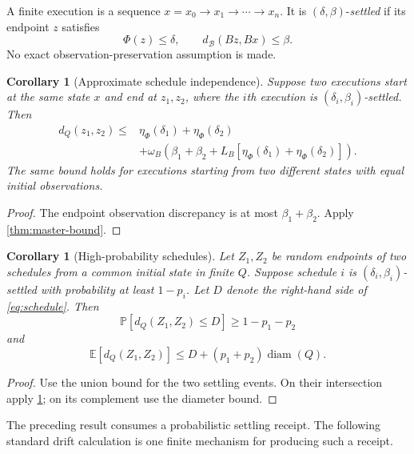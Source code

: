 \documentclass[11pt]{article}
\newtheorem{corollary}[theorem]{Corollary}
\theoremstyle{definition}
\theoremstyle{remark}
\numberwithin{equation}{section}
\newcommand{\diam}{\operatorname{diam}}
\newcommand{\cB}{\mathcal B}
\begin{document}
A finite execution is a sequence $x=x_0\to x_1\to\cdots\to x_n$.  It is $(\delta,\beta)$-\emph{settled} if its endpoint $z$ satisfies
\[
 \Phi(z)\le\delta,
 \qquad d_{\cB}(Bz,Bx)\le\beta.
\]
No exact observation-preservation assumption is made.

\begin{corollary}[Approximate schedule independence]\label{cor:schedule}
Suppose two executions start at the same state $x$ and end at $z_1,z_2$, where the $i$th execution is $(\delta_i,\beta_i)$-settled.  Then
\begin{equation}\label{eq:schedule}
\begin{split}
 d_Q(z_1,z_2)\le{}&\eta_\Phi(\delta_1)+\eta_\Phi(\delta_2)\\
 &+\omega_B\!\left(
 \beta_1+\beta_2+L_B[\eta_\Phi(\delta_1)+\eta_\Phi(\delta_2)]
 \right).
\end{split}
\end{equation}
The same bound holds for executions starting from two different states with equal initial observations.
\end{corollary}

\begin{proof}
The endpoint observation discrepancy is at most $\beta_1+\beta_2$.  Apply \cref{thm:master-bound}.
\end{proof}

\begin{corollary}[High-probability schedules]\label{cor:probabilistic}
Let $Z_1,Z_2$ be random endpoints of two schedules from a common initial state in finite $Q$.  Suppose schedule $i$ is $(\delta_i,\beta_i)$-settled with probability at least $1-p_i$.  Let $D$ denote the right-hand side of \eqref{eq:schedule}.  Then
\[
 \mathbb P[d_Q(Z_1,Z_2)\le D]\ge1-p_1-p_2
\]
and
\[
 \mathbb E[d_Q(Z_1,Z_2)]
 \le D+(p_1+p_2)\diam(Q).
\]
\end{corollary}

\begin{proof}
Use the union bound for the two settling events.  On their intersection apply \cref{cor:schedule}; on its complement use the diameter bound.
\end{proof}

The preceding result consumes a probabilistic settling receipt.  The following
standard drift calculation is one finite mechanism for producing such a
receipt.
\end{document}
